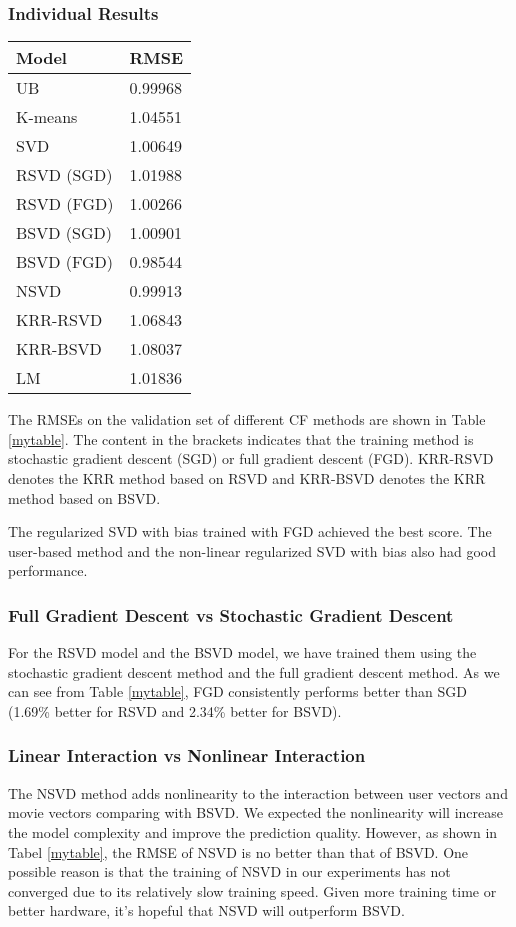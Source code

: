 \documentclass[10pt,conference,compsocconf]{IEEEtran}
\begin{document}
\subsubsection{Individual Results}
\begin{table*}[htbp]
  \centering
  \begin{tabular}[c]{|l||l|}
    \hline
    Model&RMSE\\
    \hline
    UB&0.99968\\
    K-means&1.04551\\
    SVD&1.00649\\
    RSVD (SGD)&1.01988\\
    RSVD (FGD)&1.00266\\
    BSVD (SGD)&1.00901\\
    BSVD (FGD)&0.98544\\
    NSVD&0.99913\\
    KRR-RSVD&1.06843\\
    KRR-BSVD&1.08037\\
    LM&1.01836\\
    \hline
  \end{tabular}
    \caption{  \label{mytable} RMSE of Different Models on Validation Set}
\end{table*}

The RMSEs on the validation set of different CF methods are shown in Table \ref{mytable}. The content in the brackets indicates that the training method is stochastic gradient descent (SGD) or full gradient descent (FGD). KRR-RSVD denotes the KRR method based on RSVD and KRR-BSVD denotes the KRR method based on BSVD.

The regularized SVD with bias trained with FGD achieved the best score. The user-based method and the non-linear regularized SVD with bias also had good performance.

\subsubsection{Full Gradient Descent vs Stochastic Gradient Descent}
For the RSVD model and the BSVD model, we have trained them using the stochastic gradient descent method and the full gradient descent method. As we can see from Table \ref{mytable}, FGD consistently performs better than SGD (1.69\% better for RSVD and 2.34\% better for BSVD).

\subsubsection{Linear Interaction vs Nonlinear Interaction}
The NSVD method adds nonlinearity to the interaction between user vectors and movie vectors comparing with BSVD. We expected the nonlinearity will increase the model complexity and improve the prediction quality. However, as shown in Tabel \ref{mytable}, the RMSE of NSVD is no better than that of BSVD. One possible reason is that the training of NSVD in our experiments has not converged due to its relatively slow training speed. Given more training time or better hardware, it's hopeful that NSVD will outperform BSVD.
\end{document}
